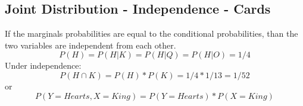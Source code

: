 \documentclass[11pt]{article}
\begin{document}
	\subsection*{Joint Distribution - Independence - Cards}
If the marginals probabilities are equal to the conditional probabilities, than the two variables are independent from each other.
\[P(H) = P(H|K)=P(H|Q)=P(H|O) = 1/4\]
Under independence:
\[P(H\cap K) = P(H)*P(K) = 1/4*1/13 = 1/52\] or
\[P(Y= Hearts, X = King) = P(Y = Hearts)*P(X = King)\]
\end{document}
